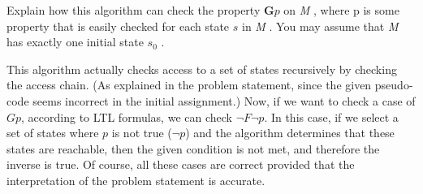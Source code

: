 \documentclass[12pt]{article}
\begin{document}
Explain how this algorithm can check the property \textbf{G}$p$ on \textit{M} , where p is some
property that is easily checked for each state $s$ in \textit{M} . You may assume that \textit{M} has exactly one initial state $s_0$ .


\begin{qsolve}
	This algorithm actually checks access to a set of states recursively by checking the access chain. (As explained in the problem statement, since the given pseudo-code seems incorrect in the initial assignment.) Now, if we want to check a case of \(Gp\), according to LTL formulas, we can check \(\neg F \neg p\). In this case, if we select a set of states where \(p\) is not true (\(\neg p\)) and the algorithm determines that these states are reachable, then the given condition is not met, and therefore the inverse is true. Of course, all these cases are correct provided that the interpretation of the problem statement is accurate.
\end{qsolve}









\vspace*{\fill}
\begin{center}
	\makeendpage

\end{center}
\vfill %
\clearpage
\end{document}
